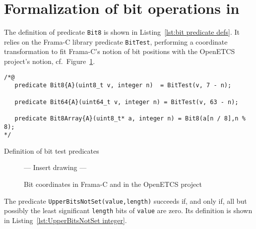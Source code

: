 \FloatBarrier

\section{Formalization of bit operations in \framac}
\label{sec:bit operations in framac}






The definition of predicate \lstinline{Bit8} is shown in 
Listing~\ref{lst:bit predicate defs}.
%
It relies on the Frama-C library predicate \lstinline{BitTest},
performing a coordinate
transformation to fit Frama-C's notion of bit positions with the
OpenETCS project's
notion, cf.\ Figure~\ref{fig:bit coords}.





\begin{listing}[hbt]
\begin{minipage}{0.99\textwidth}
\begin{lstlisting}[style=acsl-block]
/*@
   predicate Bit8{A}(uint8_t v, integer n)  = BitTest(v, 7 - n);

   predicate Bit64{A}(uint64_t v, integer n) = BitTest(v, 63 - n);

   predicate Bit8Array{A}(uint8_t* a, integer n) = Bit8(a[n / 8],n % 8);
*/
\end{lstlisting}
\end{minipage}
\caption{\label{lst:bit predicate defs}Definition of bit test predicates}
\end{listing}













\begin{figure}
\begin{center}
\vspace*{2cm}
--- Insert drawing --- 
\vspace*{2cm}
\caption{\label{fig:bit coords}
        Bit coordinates in Frama-C and in the OpenETCS project}
\end{center}
\end{figure}






The predicate \lstinline{UpperBitsNotSet(value,length)} succeeds if,
and only if,
all but possibly 
the least significant \lstinline{length} bits of \lstinline{value} are zero.
%
Its definition is shown in Listing~\ref{lst:UpperBitsNotSet integer}.







